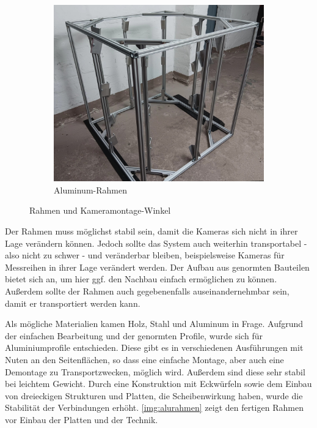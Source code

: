 \documentclass[./00PhotoBox.tex]{subfiles}
\begin{document}
\begin{figure}
\begin{subfigure}{0.45\textwidth}
        \includegraphics[height=0.9\linewidth]{./img/alurahmen.jpg}
        \centering
        \caption{Aluminum-Rahmen} %
        \label{img:alurahmen} %
    \end{subfigure}
    \caption{Rahmen und Kameramontage-Winkel} %
\end{figure}

Der Rahmen muss möglichst stabil sein, damit die Kameras sich nicht in ihrer Lage verändern können. Jedoch sollte das System auch weiterhin transportabel - also nicht zu schwer - und veränderbar bleiben, beispielsweise Kameras für Messreihen in ihrer Lage verändert werden. Der Aufbau aus genormten Bauteilen bietet sich an, um hier ggf. den Nachbau einfach ermöglichen zu können. Außerdem sollte der Rahmen auch gegebenenfalls auseinandernehmbar sein, damit er transportiert werden kann.

Als mögliche Materialien kamen Holz, Stahl und Aluminum in Frage. Aufgrund der einfachen Bearbeitung und der genormten Profile, wurde sich für Aluminiumprofile entschieden. Diese gibt es in verschiedenen Ausführungen mit Nuten an den Seitenflächen, so dass eine einfache Montage, aber auch eine Demontage zu Transportzwecken, möglich wird. Außerdem sind diese sehr stabil bei leichtem Gewicht. Durch eine Konstruktion mit Eckwürfeln sowie dem Einbau von dreieckigen Strukturen und Platten, die Scheibenwirkung haben, wurde die Stabilität der Verbindungen erhöht. \autoref{img:alurahmen} zeigt den fertigen Rahmen vor Einbau der Platten und der Technik.
\end{document}
